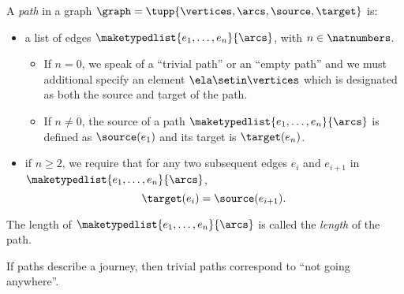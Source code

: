 \begin{definition}[Paths]
    \label{def:path}
    A \emph{path} in a graph $\graph=\tupp{\vertices,\arcs, \source,\target}$ is:

    \constit

    \begin{itemize}
        \item a list of edges $\maketypedlist{e_1, \dots, e_n}{\arcs}$, with $n \in \natnumbers$.
              \begin{itemize}
                  \item If $n = 0$, we speak of a ``trivial path'' or an ``empty path'' and we must additional specify an element $\ela \setin \vertices$ which is designated as both the source and target of the path.
                  \item If $n \neq 0$, the source of a path $\maketypedlist{e_1, \dots, e_n}{\arcs}$ is defined as $\source(e_1)$ and its target is $\target(e_n)$.
              \end{itemize}
    \end{itemize}

    \condit

    \begin{itemize}
        \item if $n \geq 2$, we require that for any two subsequent edges $e_i$ and $e_{i+1}$ in $\maketypedlist{e_1, \dots, e_n}{\arcs}$,
              \begin{equation}
                  \target(e_i) = \source(e_{i+1}).
              \end{equation}
    \end{itemize}
    The length of $\maketypedlist{e_1, \dots, e_n}{\arcs}$ is called the \emph{length} of the path.
\end{definition}

\begin{remark}
    If paths describe a journey, then trivial paths correspond to ``not going anywhere''.
\end{remark}
